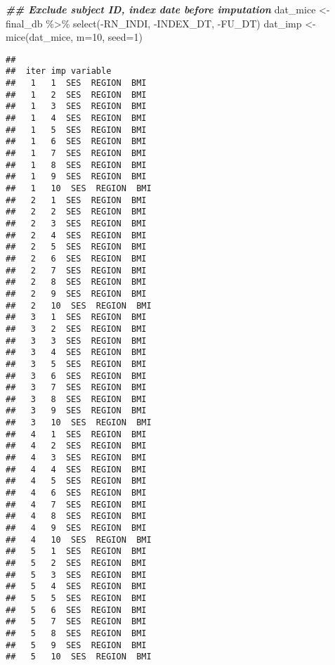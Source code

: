\documentclass[
]{book}
\newenvironment{Shaded}{\begin{snugshade}}{\end{snugshade}}
\newcommand{\AttributeTok}[1]{\textcolor[rgb]{0.77,0.63,0.00}{#1}}
\newcommand{\DecValTok}[1]{\textcolor[rgb]{0.00,0.00,0.81}{#1}}
\newcommand{\DocumentationTok}[1]{\textcolor[rgb]{0.56,0.35,0.01}{\textbf{\textit{#1}}}}
\newcommand{\FunctionTok}[1]{\textcolor[rgb]{0.00,0.00,0.00}{#1}}
\newcommand{\NormalTok}[1]{#1}
\newcommand{\OtherTok}[1]{\textcolor[rgb]{0.56,0.35,0.01}{#1}}
\newcommand{\SpecialCharTok}[1]{\textcolor[rgb]{0.00,0.00,0.00}{#1}}
\begin{document}
\begin{Shaded}
\begin{Highlighting}[]
\DocumentationTok{\#\# Exclude subject ID, index date before imputation}
\NormalTok{dat\_mice }\OtherTok{\textless{}{-}}\NormalTok{ final\_db }\SpecialCharTok{\%\textgreater{}\%} \FunctionTok{select}\NormalTok{(}\SpecialCharTok{{-}}\NormalTok{RN\_INDI, }\SpecialCharTok{{-}}\NormalTok{INDEX\_DT, }\SpecialCharTok{{-}}\NormalTok{FU\_DT) }
\NormalTok{dat\_imp }\OtherTok{\textless{}{-}} \FunctionTok{mice}\NormalTok{(dat\_mice, }\AttributeTok{m=}\DecValTok{10}\NormalTok{, }\AttributeTok{seed=}\DecValTok{1}\NormalTok{)}
\end{Highlighting}
\end{Shaded}

\begin{verbatim}
## 
##  iter imp variable
##   1   1  SES  REGION  BMI
##   1   2  SES  REGION  BMI
##   1   3  SES  REGION  BMI
##   1   4  SES  REGION  BMI
##   1   5  SES  REGION  BMI
##   1   6  SES  REGION  BMI
##   1   7  SES  REGION  BMI
##   1   8  SES  REGION  BMI
##   1   9  SES  REGION  BMI
##   1   10  SES  REGION  BMI
##   2   1  SES  REGION  BMI
##   2   2  SES  REGION  BMI
##   2   3  SES  REGION  BMI
##   2   4  SES  REGION  BMI
##   2   5  SES  REGION  BMI
##   2   6  SES  REGION  BMI
##   2   7  SES  REGION  BMI
##   2   8  SES  REGION  BMI
##   2   9  SES  REGION  BMI
##   2   10  SES  REGION  BMI
##   3   1  SES  REGION  BMI
##   3   2  SES  REGION  BMI
##   3   3  SES  REGION  BMI
##   3   4  SES  REGION  BMI
##   3   5  SES  REGION  BMI
##   3   6  SES  REGION  BMI
##   3   7  SES  REGION  BMI
##   3   8  SES  REGION  BMI
##   3   9  SES  REGION  BMI
##   3   10  SES  REGION  BMI
##   4   1  SES  REGION  BMI
##   4   2  SES  REGION  BMI
##   4   3  SES  REGION  BMI
##   4   4  SES  REGION  BMI
##   4   5  SES  REGION  BMI
##   4   6  SES  REGION  BMI
##   4   7  SES  REGION  BMI
##   4   8  SES  REGION  BMI
##   4   9  SES  REGION  BMI
##   4   10  SES  REGION  BMI
##   5   1  SES  REGION  BMI
##   5   2  SES  REGION  BMI
##   5   3  SES  REGION  BMI
##   5   4  SES  REGION  BMI
##   5   5  SES  REGION  BMI
##   5   6  SES  REGION  BMI
##   5   7  SES  REGION  BMI
##   5   8  SES  REGION  BMI
##   5   9  SES  REGION  BMI
##   5   10  SES  REGION  BMI
\end{verbatim}
\end{document}
